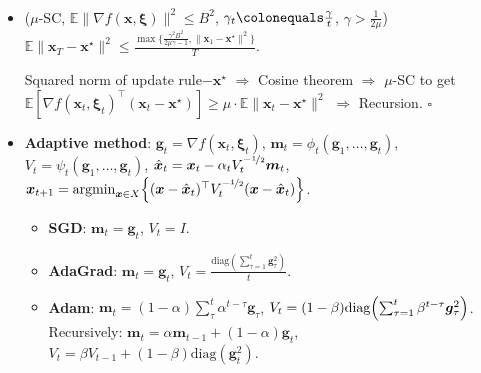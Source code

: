 \documentclass[8pt,a4paper]{extarticle}
\renewcommand{\proof}[1]{\begin{tcolorbox}#1 \hfill $\square$\end{tcolorbox}}
\DeclareMathOperator*{\argmin}{argmin}
\newcommand{\lft}{\mathopen{}\mathclose\bgroup\left}
\newcommand{\rgt}{\aftergroup\egroup\right}
\newcommand{\E}{\mathbb{E}}
\renewcommand{\vec}[1]{\bm{#1}}
\newcommand{\mat}[1]{#1}
\newenvironment{topic}[1]
{\textbf{\sffamily \colorbox{black}{\rlap{\textbf{\textcolor{white}{#1}}}\hspace{\linewidth}\hspace{-2\fboxsep}}} \\ \vspace{0.2cm}}
{}
\begin{document}
\begin{multicols*}{2}
\begin{topic}{Stochastic optimization}
\begin{itemize}
            \item ($\mu$-SC, $\E \| \nabla f(\vec{x}, \vec{\xi}) \|^2 \leq B^2$, $\gamma_t \colonequals \frac{\gamma}{t}$, $\gamma > \frac{1}{2 \mu}$)\\
                  $\E \| \vec{x}_T - \vec{x}^\star \|^2 \leq \frac{\max \{ \frac{\gamma^2 B^2}{2 \mu \gamma - 1}, \| \vec{x}_1 - \vec{x}^\star \|^2 \}}{T}$.
                  \proof{Squared norm of update rule$-\vec{x}^\star$ $\Rightarrow$ Cosine theorem $\Rightarrow$ $\mu$-SC to get $\E[\nabla f(\vec{x}_t, \vec{\xi}_t)^\top(\vec{x}_t - \vec{x}^\star)] \geq \mu \cdot \E \| \vec{x}_t - \vec{x}^\star \|^2$ $\Rightarrow$ Recursion.}
            \item \textbf{Adaptive method}: $\vec{g}_t = \nabla f(\vec{x}_t, \vec{\xi}_t)$, $\vec{m}_t = \phi_t(\vec{g}_1, \ldots, \vec{g}_t)$, $\mat{V}_t = \psi_t(\vec{g}_1, \ldots, \vec{g}_t)$, $\hat{\vec{x}}_t = \vec{x}_t - \alpha_t \mat{V}_t^{-\nicefrac{1}{2}} \vec{m}_t$, $\vec{x}_{t+1} = \argmin_{\vec{x} \in X} \lft\{ (\vec{x} - \hat{\vec{x}}_t)^\top \mat{V}_t^{-\nicefrac{1}{2}}(\vec{x} - \hat{\vec{x}}_t) \rgt\}$.
                  \begin{itemize}
                      \item \textbf{SGD}: $\vec{m}_t = \vec{g}_t$, $\mat{V}_t = \mat{I}$.
                      \item \textbf{AdaGrad}: $\vec{m}_t = \vec{g}_t$, $\mat{V}_t = \frac{\mathrm{diag}(\sum_{\tau=1}^{t} \vec{g}_{\tau}^2)}{t}$.
                      \item \textbf{Adam}: $\vec{m}_t = (1-\alpha) \sum_{\tau}^{t} \alpha^{t-\tau} \vec{g}_{\tau}$, $\mat{V}_t = (1-\beta) \mathrm{diag} \lft( \sum_{\tau=1}^{t} \beta^{t-\tau} \vec{g}_{\tau}^2 \rgt)$.
                            Recursively: $\vec{m}_t = \alpha \vec{m}_{t-1} + (1-\alpha) \vec{g}_t$, $\mat{V}_t = \beta \mat{V}_{t-1} + (1-\beta)\mathrm{diag}(\vec{g}_t^2)$.
                  \end{itemize}
        \end{itemize}
    \end{topic}


\end{multicols*}
\end{document}
